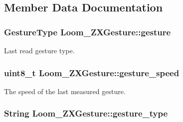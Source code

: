 \subsection{Member Data Documentation}
\subsubsection[{\texorpdfstring{gesture}{gesture}}]{\setlength{\rightskip}{0pt plus 5cm}Gesture\+Type Loom\+\_\+\+Z\+X\+Gesture\+::gesture\hspace{0.3cm}{\ttfamily [protected]}}\hypertarget{class_loom___z_x_gesture_ad671101df307f96d5a8c1e281a3eaea9}{}\label{class_loom___z_x_gesture_ad671101df307f96d5a8c1e281a3eaea9}


Last read gesture type. 

\subsubsection[{\texorpdfstring{gesture\+\_\+speed}{gesture_speed}}]{\setlength{\rightskip}{0pt plus 5cm}uint8\+\_\+t Loom\+\_\+\+Z\+X\+Gesture\+::gesture\+\_\+speed\hspace{0.3cm}{\ttfamily [protected]}}\hypertarget{class_loom___z_x_gesture_a9236f5979e3a46c0db2164bd343be305}{}\label{class_loom___z_x_gesture_a9236f5979e3a46c0db2164bd343be305}


The speed of the last measured gesture. 

\subsubsection[{\texorpdfstring{gesture\+\_\+type}{gesture_type}}]{\setlength{\rightskip}{0pt plus 5cm}String Loom\+\_\+\+Z\+X\+Gesture\+::gesture\+\_\+type\hspace{0.3cm}{\ttfamily [protected]}}\hypertarget{class_loom___z_x_gesture_afc1047aaf8abcbb6e9b155e2c025ddb9}{}\label{class_loom___z_x_gesture_afc1047aaf8abcbb6e9b155e2c025ddb9}


